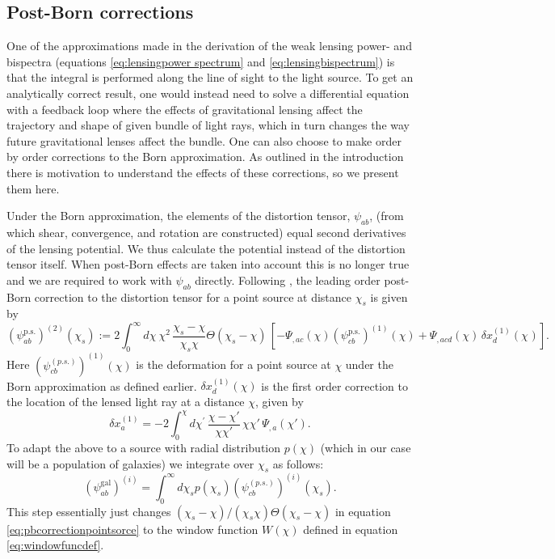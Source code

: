 \documentclass[11pt]{article} %
\begin{document}
\subsection{Post-Born corrections}
One of the approximations made in the derivation of the weak lensing power- and bispectra (equations \eqref{eq:lensingpower spectrum} and \eqref{eq:lensingbispectrum}) is that the integral is performed along the line of sight to the light source. To get an analytically correct result, one would instead need to solve a differential equation with a feedback loop where the effects of gravitational lensing affect the trajectory and shape of given bundle of light rays, which in turn changes the way future gravitational lenses affect the bundle. One can also choose to make order by order corrections to the Born approximation. As outlined in the introduction there is motivation to understand the effects of these corrections, so we present them here.

Under the Born approximation, the elements of the distortion tensor, $\psi_{ab}$, (from which shear, convergence, and rotation are constructed) equal second derivatives of the lensing potential. We thus calculate the potential instead of the distortion tensor itself. When post-Born effects are taken into account this is no longer true and we are required to work with $\psi_{ab}$ directly. Following \cite{postborn_pratten_lewis}, the leading order post-Born correction to the distortion tensor for a point source at distance $\chi_s$ is given by
\begin{equation}
    \left( \psi_{ab}^{\text{p.s.}}  \right)^{(2)}(\chi_s) := 2 \int^{\infty}_0 d \chi^{} \, \chi^2 \, \frac{\chi_s - \chi}{\chi_s\chi}\Theta(\chi_s - \chi) \, \left[ - \Psi_{,ac} (\chi) \left(\psi^{\text{p.s.}}_{cb}\right)^{(1)} (\chi) + \Psi_{,acd} (\chi) \, \delta x_d^{(1)} (\chi^{}) \right].
    \label{eq:pbcorrectionpointsorce}
\end{equation}
Here $\left(\psi_{cb}^{(p.s.)}\right)^{(1)}(\chi)$ is the deformation for a point source at $\chi$ under the Born approximation as defined earlier. $\delta x_d^{(1)}(\chi)$ is the first order correction to the location of the lensed light ray at a distance $\chi$, given by
\begin{equation}
\delta x_a^{(1)} = -2 \int^{\chi}_0 d \chi^{\prime} \, \frac{\chi-\chi'}{\chi\chi'} \, \chi \chi' \, \Psi_{,a} (\chi').
\end{equation}
To adapt the above to a source with radial distribution $p(\chi)$ (which in our case will be a population of galaxies) we integrate over $\chi_s$ as follows:
\begin{equation}
    (\psi_{ab}^{\text{gal}})^{(i)} = \int_0^\infty d \chi_s p(\chi_s)\left(\psi_{cb}^{(p.s.)}\right)^{(i)}(\chi_s).
\end{equation}
This step essentially just changes $(\chi_s - \chi)/(\chi_s\chi)\Theta(\chi_s-\chi)$ in equation \eqref{eq:pbcorrectionpointsorce} to the window function $W(\chi)$ defined in equation \eqref{eq:windowfuncdef}.
\end{document}
